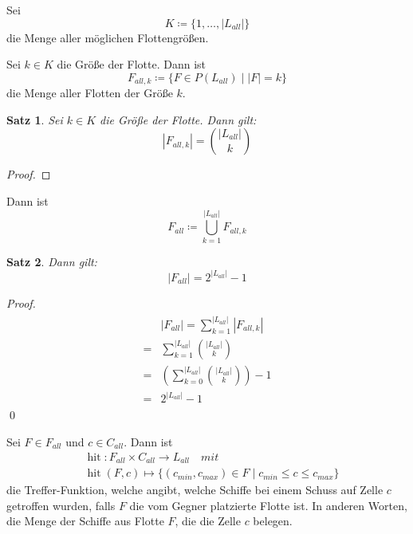 \documentclass[a4paper,12pt]{llncs}
\numberwithin{equation}{section}
\newtheorem{satz}{Satz}
\DeclareMathOperator{\hit}{hit}
\begin{document}
\begin{definition}
Sei 
\[
K \coloneqq \{1, \dots, |L_{all}|\}
\]
die Menge aller möglichen Flottengrößen.
\end{definition}

\begin{definition}
Sei $k \in K$ die Größe der Flotte.
Dann ist
\[
F_{all,k} \coloneqq\{F \in P(L_{all}) \mid |F| = k\}
\]
die Menge aller Flotten der Größe $k$.
\end{definition}

\begin{satz}
Sei $k \in K$ die Größe der Flotte.
Dann gilt:
\[
|F_{all,k}|=\binom{|L_{all}|}{k}
\]
\end{satz}

\begin{proof}
\end{proof}

\begin{definition}
Dann ist
\[
F_{all} \coloneqq \bigcup_{k=1}^{|L_{all}|} F_{all,k}
\]
\end{definition}

\begin{satz}
Dann gilt:
\[
|F_{all}|=2^{|L_{all}|} - 1
\]
\end{satz}

\begin{proof}
\begin{align}
\begin{split}
&|F_{all}|=\sum_{k=1}^{|L_{all}|} |F_{all,k}|\\
=&\sum_{k=1}^{|L_{all}|} \binom{|L_{all}|}{k} \\
=&\left( \sum_{k=0}^{|L_{all}|} \binom{|L_{all}|}{k} \right) - 1 \\
=&2^{|L_{all}|} - 1
\end{split}
\end{align}
\qed
\end{proof}


\begin{definition}
Sei $F \in F_{all}$ und $c \in C_{all}$.
Dann ist 
\begin{align}
&\hit:F_{all} \times C_{all} \rightarrow L_{all} \quad mit \nonumber\\
&\hit(F, c)\mapsto \{(c_{min}, c_{max}) \in F \mid c_{min} \leq c \leq c_{max}\} \nonumber
\end{align}
die Treffer-Funktion, welche angibt, welche Schiffe bei einem Schuss auf Zelle $c$ getroffen wurden, falls $F$ die vom Gegner platzierte Flotte ist. In anderen Worten, die Menge der Schiffe aus Flotte $F$, die die Zelle $c$ belegen.
\end{definition}
\end{document}
